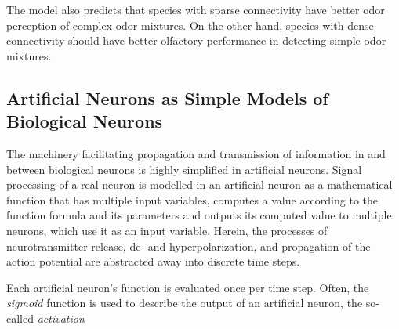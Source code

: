 The model also predicts that species with sparse connectivity have
better odor perception of complex odor mixtures. On the other hand,
species with dense connectivity should have better olfactory performance
in detecting simple odor mixtures.

\subsection{Artificial Neurons as Simple Models of Biological Neurons\label{subsec:Artificial-Neurons-as-Simple-Models-of-Biological-Neurons}}

The machinery facilitating propagation and transmission of information
in and between biological neurons is highly simplified in artificial
neurons. Signal processing
of a real neuron is modelled in an artificial neuron as a mathematical
function that has multiple input variables, computes a value according
to the function formula and its parameters and outputs its computed
value to multiple neurons, which use it as an input variable. Herein,
the processes of neurotransmitter release, de- and hyperpolarization,
and propagation of the action potential are abstracted away into discrete
time steps.

Each artificial neuron's function is evaluated once per time step.
Often, the \emph{sigmoid}\emph{ }function
is used to describe the output of an artificial neuron, the so-called
\emph{activation}

